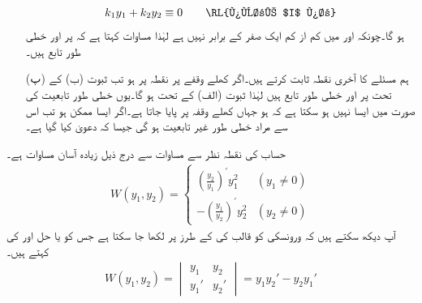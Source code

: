 \begin{enumerate}
\begin{align}\label{مساوات_سادہ_دو_درجی_ثبوت_ت}
k_1y_1+k_2y_2\equiv 0\quad \quad \text{\RL{پورے $I$ پر}}
\end{align}
ہو گا۔چونکہ  اور  میں کم از کم ایک صفر کے برابر نہیں ہے لہٰذا  مساوات  کہتا ہے کہ  پر  اور  خطی طور تابع ہیں۔
\item[(پ)]
ہم مسئلے کا آخری نقطہ ثابت کرتے ہیں۔اگر کھلے وقفے  پر نقطہ  پر  ہو تب ثبوت (ب) کے تحت  پر  اور  خطی طور تابع ہیں لہٰذا ثبوت (الف) کے تحت  ہو گا۔یوں خطی طور تابعیت کی صورت میں ایسا نہیں ہو سکتا ہے کہ  ہو جہاں  کھلے وقفہ  پر پایا جاتا ہے۔اگر ایسا ممکن ہو تب اس سے مراد خطی طور غیر تابعیت ہو گی جیسا کہ دعویٰ کیا گیا ہے۔ 
\end{enumerate}

حساب کی نقطہ نظر سے  مساوات  سے درج ذیل زیادہ آسان مساوات ہے۔
\begin{align}\label{مساوات_سادہ_دو_آسان_ورونسکی}
W(y_1,y_2)=
\begin{cases}
\left(\frac{y_2}{y_1}\right)^{\!'}y_1^2  &(y_1 \ne 0)\\[0.5em]
-\left(\frac{y_1}{y_2}\right)^{\!'}y_2^2 & (y_2 \ne 0)
\end{cases}
\end{align}
آپ دیکھ سکتے ہیں کہ  ورونسکی کو قالب کی  کے طرز پر لکھا جا سکتا ہے جس کو  یا حل  اور  کی  کہتے ہیں۔ 
\begin{align}
W(y_1,y_2)=
\begin{vmatrix}
y_1 &y_2\\[0.25em]
y_1' & y_2'
\end{vmatrix}
=y_1y_2'-y_2y_1'
\end{align}

